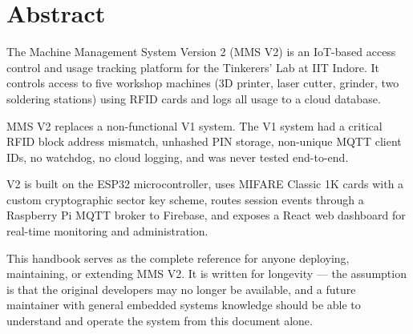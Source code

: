 \documentclass[12pt,a4paper,twoside]{report}
\begin{document}
\chapter*{Abstract}

The Machine Management System Version 2 (MMS V2) is an IoT-based access control and usage tracking platform for the Tinkerers' Lab at IIT Indore. It controls access to five workshop machines (3D printer, laser cutter, grinder, two soldering stations) using RFID cards and logs all usage to a cloud database.

MMS V2 replaces a non-functional V1 system. The V1 system had a critical RFID block address mismatch, unhashed PIN storage, non-unique MQTT client IDs, no watchdog, no cloud logging, and was never tested end-to-end.

V2 is built on the ESP32 microcontroller, uses MIFARE Classic 1K cards with a custom cryptographic sector key scheme, routes session events through a Raspberry Pi MQTT broker to Firebase, and exposes a React web dashboard for real-time monitoring and administration.

This handbook serves as the complete reference for anyone deploying, maintaining, or extending MMS V2. It is written for longevity --- the assumption is that the original developers may no longer be available, and a future maintainer with general embedded systems knowledge should be able to understand and operate the system from this document alone.

\tableofcontents

\listoftables

\listoffigures

















\appendix











% 
% 
\end{document}

